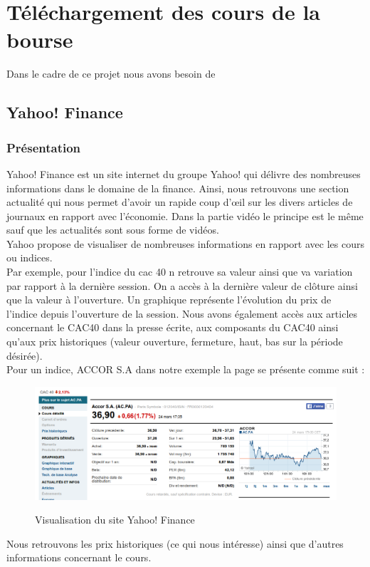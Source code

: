 \section{Téléchargement des cours de la bourse}

Dans le cadre de ce projet nous avons besoin de 

\subsection{Yahoo! Finance}

\subsubsection{Présentation}

Yahoo! Finance est un site internet du groupe Yahoo! qui délivre des nombreuses informations dans le domaine de la finance. Ainsi, nous retrouvons une section actualité qui nous permet d'avoir un rapide coup d’œil sur les divers articles de journaux en rapport avec l'économie. Dans la partie vidéo le principe est le même sauf que les actualités sont sous forme de vidéos. \\

Yahoo propose de visualiser de nombreuses informations en rapport avec les cours ou indices. \\

Par exemple, pour l'indice du cac 40 n retrouve sa valeur ainsi que va variation par rapport à la dernière session. On a accès à la dernière valeur de clôture ainsi que la valeur à l'ouverture. Un graphique représente l'évolution du prix de l'indice depuis l'ouverture de la session. Nous avons également accès aux articles concernant le CAC40 dans la presse écrite, aux composants du CAC40 ainsi qu'aux prix historiques (valeur ouverture, fermeture, haut, bas sur la période désirée). \\


Pour un indice, ACCOR S.A dans notre exemple la page se présente comme suit : \\
\begin{figure}[!h]
  \center
  \includegraphics[scale=0.4]{../graph/yahoo.png} \\
  \caption{Visualisation du site Yahoo! Finance}
\end{figure}
Nous retrouvons les prix historiques (ce qui nous intéresse) ainsi que d'autres informations concernant le cours. 

